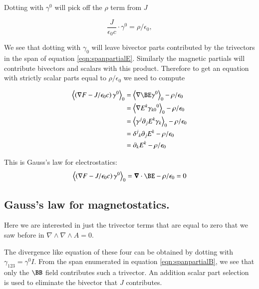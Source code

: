 \documentclass{article}      %
\newcommand{\gpgrade}[2] {{\left\langle{{#1}}\right\rangle}_{#2}}
\newcommand{\gpgradezero}[1] {\gpgrade{#1}{0}}
\newcommand{\grad}[0]{\nabla}
\newcommand{\spacegrad}[0]{\boldsymbol{\nabla}}
\begin{document}
Dotting with $\gamma^0$ will pick off the $\rho$ term from
$J$

\begin{equation*}
\frac{J}{\epsilon_0 c} \cdot \gamma^0 = \rho/\epsilon_0,
\end{equation*}

We see that dotting
with $\gamma_0$ will leave bivector parts contributed by the trivectors in
the span of equation \ref{eqn:spanpartialE}.  Similarly the magnetic partials
will contribute bivectors and scalars with this product.  Therefore to
get an equation with strictly scalar parts equal to $\rho/\epsilon_0$ we need
to compute

\begin{align*}
\gpgradezero{\left(\grad F - J/\epsilon_0 c\right) \gamma^0} 
&= \gpgradezero{\grad \BE \gamma^0} - \rho/\epsilon_0 \\
&= \gpgradezero{\grad E^k {\gamma_{k0}}^0} - \rho/\epsilon_0 \\
&= \gpgradezero{ \gamma^j \partial_{j} E^k \gamma_{k} } - \rho/\epsilon_0 \\
&= {\delta^j}_k \partial_{j} E^k - \rho/\epsilon_0 \\
&= \partial_{k} E^k - \rho/\epsilon_0 \\
\end{align*}

This is Gauss's law for electrostatics:
\begin{equation}\label{eqn:gausselectro}
\gpgradezero{\left(\grad F - J/\epsilon_0 c\right) \gamma^0} = \spacegrad \cdot \BE - \rho/\epsilon_0 = 0
\end{equation}

\subsection{ Gauss's law for magnetostatics. }

Here we are interested in just the trivector terms that are equal to zero that we saw before in $\grad \wedge \grad \wedge A = 0$.

The divergence like equation of these four can be obtained by dotting with $\gamma_{123} = \gamma^0 I$.  From the span enumerated
in equation \ref{eqn:spanpartialB}, we see that only the $\BB$ field contributes such a trivector.  An addition scalar part selection is used
to eliminate the bivector that $J$ contributes.
\end{document}
